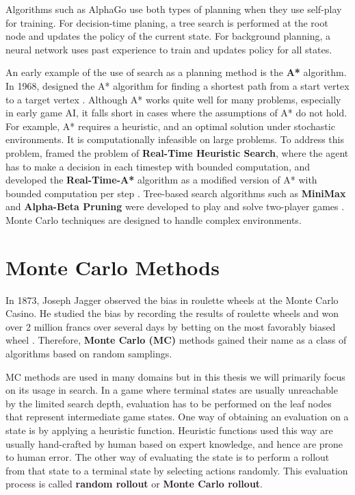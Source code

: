 Algorithms such as AlphaGo use both types of planning when they use self-play for training.
For decision-time planing, a tree search is performed at the root node and updates the policy of the current state.
For background planning, a neural network uses past experience to train and updates policy for all states.

An early example of the use of search as a planning method is the \textbf{A*} algorithm.
In 1968, \citeauthor{FormalBasisHeuristic_Hart.Nilsson.ea_1968} designed the A* algorithm for finding a shortest path from a start vertex to a target vertex \cite{FormalBasisHeuristic_Hart.Nilsson.ea_1968}.
Although A* works quite well for many problems, especially in early game AI, it falls short in cases where the assumptions of A* do not hold.
For example, A* requires a heuristic, and an optimal solution under stochastic environments.
It is computationally infeasible on large problems.
To address this problem, \citeauthor{RealtimeHeuristicSearch_Korf_1990} framed the problem of \textbf{Real-Time Heuristic Search},
where the agent has to make a decision in each timestep with bounded computation, and developed the \textbf{Real-Time-A*} algorithm as a modified version of A* with bounded computation per step \cite{RealtimeHeuristicSearch_Korf_1990}.
Tree-based search algorithms such as \textbf{MiniMax} and \textbf{Alpha-Beta Pruning} were developed to play and solve two-player games \cite{AnalysisAlphaBetaPriming_Knuth.Moore_1975}.
Monte Carlo techniques are designed to handle complex environments.

\section{Monte Carlo Methods}
In 1873, Joseph Jagger observed the bias in roulette wheels at the Monte Carlo Casino.
He studied the bias by recording the results of roulette wheels and won over 2 million francs over several days by betting on the most favorably biased wheel \cite{MonteCarloCasino__2022}.
Therefore, \textbf{Monte Carlo (MC)} methods gained their name as a class of algorithms based on random samplings.

MC methods are used in many domains but in this thesis we will primarily focus on its usage in search.
In a game where terminal states are usually unreachable by the limited search depth, evaluation has to be performed on the leaf nodes that represent intermediate game states.
One way of obtaining an evaluation on a state is by applying a heuristic function.
Heuristic functions used this way are usually hand-crafted by human based on expert knowledge, and hence are prone to human error.
The other way of evaluating the state is to perform a rollout from that state to a terminal state by selecting actions randomly.
This evaluation process is called \textbf{random rollout} or \textbf{Monte Carlo rollout}.

